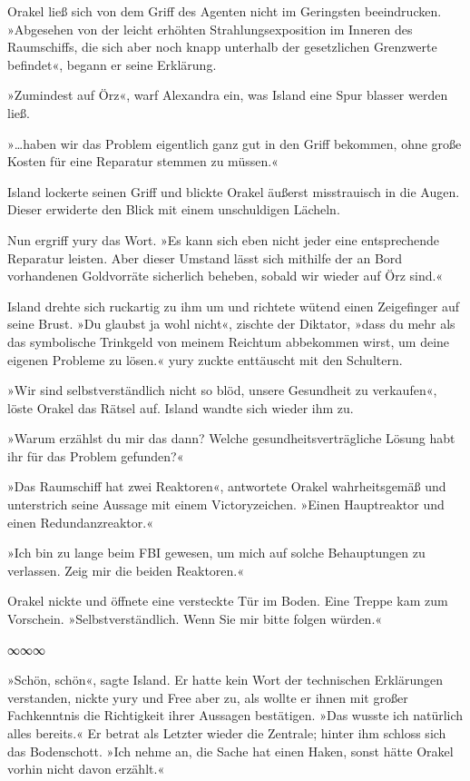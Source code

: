 Orakel ließ sich von dem Griff des Agenten nicht im Geringsten beeindrucken. »Abgesehen von der leicht erhöhten Strahlungsexposition im Inneren des Raumschiffs, die sich aber noch knapp unterhalb der gesetzlichen Grenzwerte befindet«, begann er seine Erklärung.

»Zumindest auf Örz«, warf Alexandra ein, was Island eine Spur blasser werden ließ.

»…haben wir das Problem eigentlich ganz gut in den Griff bekommen, ohne große Kosten für eine Reparatur stemmen zu müssen.«

Island lockerte seinen Griff und blickte Orakel äußerst misstrauisch in die Augen. Dieser erwiderte den Blick mit einem unschuldigen Lächeln.

Nun ergriff yury das Wort. »Es kann sich eben nicht jeder eine entsprechende Reparatur leisten. Aber dieser Umstand lässt sich mithilfe der an Bord vorhandenen Goldvorräte sicherlich beheben, sobald wir wieder auf Örz sind.«

Island drehte sich ruckartig zu ihm um und richtete wütend einen Zeigefinger auf seine Brust. »Du glaubst ja wohl nicht«, zischte der Diktator, »dass du mehr als das symbolische Trinkgeld von meinem Reichtum abbekommen wirst, um deine eigenen Probleme zu lösen.« yury zuckte enttäuscht mit den Schultern.

»Wir sind selbstverständlich nicht so blöd, unsere Gesundheit zu verkaufen«, löste Orakel das Rätsel auf. Island wandte sich wieder ihm zu.

»Warum erzählst du mir das dann? Welche gesundheitsverträgliche Lösung habt ihr für das Problem gefunden?«

»Das Raumschiff hat zwei Reaktoren«, antwortete Orakel wahrheitsgemäß und unterstrich seine Aussage mit einem Victoryzeichen. »Einen Hauptreaktor und einen Redundanzreaktor.«

»Ich bin zu lange beim FBI gewesen, um mich auf solche Behauptungen zu verlassen. Zeig mir die beiden Reaktoren.«

Orakel nickte und öffnete eine versteckte Tür im Boden. Eine Treppe kam zum Vorschein. »Selbstverständlich. Wenn Sie mir bitte folgen würden.«

\begin{center}
∞∞∞
\end{center}

»Schön, schön«, sagte Island. Er hatte kein Wort der technischen Erklärungen verstanden, nickte yury und Free aber zu, als wollte er ihnen mit großer Fachkenntnis die Richtigkeit ihrer Aussagen bestätigen. »Das wusste ich natürlich alles bereits.« Er betrat als Letzter wieder die Zentrale; hinter ihm schloss sich das Bodenschott. »Ich nehme an, die Sache hat einen Haken, sonst hätte Orakel vorhin nicht davon erzählt.«

